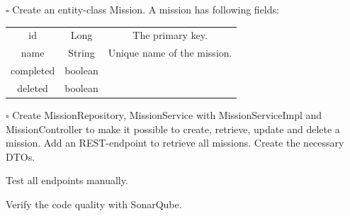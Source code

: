 \begin{oefening}
$\square$ Create an entity-class Mission.
A mission has following fields:
\begin{tabular}{|c|c|c|}
\hline
id & Long & The primary key.\\
name & String & Unique name of the mission.\\
completed & boolean & \\
deleted & boolean & \\
\hline
\end{tabular}

$\square$ Create MissionRepository, MissionService with MissionServiceImpl and MissionController to make it possible to create, retrieve, update and delete a mission. Add an REST-endpoint to retrieve all missions. Create the necessary DTOs.




Test all endpoints manually.

Verify the code quality with SonarQube.
\end{oefening}


